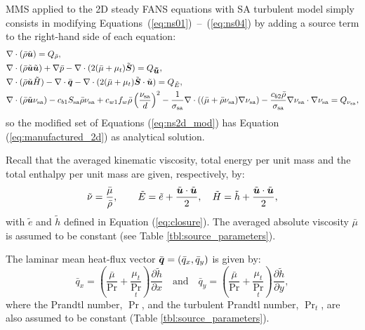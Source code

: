 \documentclass[10pt]{article}
\newcommand{\diff}[2] {\dfrac{\partial #1}{\partial #2}}
\newcommand{\bv}[1]{\ensuremath{\mbox{\boldmath$ #1 $}}}
\newcommand{\sa}{\nu_{\mathrm{sa}}}
\newcommand{\tsa}{\mathrm{sa}}
\newcommand{\brho}{\bar{\rho}}
\newcommand{\tu}{\tilde{u}}
\newcommand{\tE}{\tilde{E}}
\newcommand{\bmu}{\bar{\mu}}
\begin{document}
MMS applied to the 2D steady FANS equations with SA turbulent model simply consists in modifying Equations~(\ref{eq:ns01})~--~(\ref{eq:ns04}) by adding a source term to the right-hand side of each equation:
 \begin{equation}
 \begin{split} \label{eq:ns2d_mod}
 &\nabla \cdot \left(\bar{\rho} \tilde{\bv{u}}\right) = Q_{\brho},\\
 &\nabla\cdot\left(\bar{\rho} \tilde{\bv{u}}\tilde{\bv{u}}\right) +\nabla \bar{p} -  \nabla \cdot ( 2(\bmu+\mu_t) \tilde{\bv{S}} )= Q_{\bv{\tu}},\\
 & \nabla \cdot (\bar{\rho} \tilde{\bv{u}} \tilde{H})-\nabla \cdot \bar{\bv{q}} - \nabla\cdot(2 (\bmu+\mu_t) \tilde{\bv{S}} \cdot \tilde{\bv{u}})= Q_{\tE},\\
 &\nabla \cdot (\bar{\rho} \tilde{\bv{u}} \sa) - c_{b1} S_\tsa \bar{\rho} \sa +c_{w1} f_w \brho \left(\dfrac{\sa}{d}\right)^2 - \dfrac{1}{\sigma_{\tsa}}\nabla \cdot \left( (\bmu+\bar{\rho}  \sa) \nabla \sa\right) -\dfrac{c_{b2} \bar{\rho} }{\sigma_{\tsa}} \nabla \sa \cdot \nabla \sa =Q_{\sa},
 \end{split}
 \end{equation}
so the modified set of Equations (\ref{eq:ns2d_mod}) has Equation (\ref{eq:manufactured_2d}) as analytical solution.

Recall that the averaged kinematic viscosity, total energy per unit mass and the total enthalpy per unit mass are given, respectively, by:
\begin{equation}
 \begin{split}\label{eq:closure01}
  \tilde{\nu}=\dfrac{\bar{\mu}}{\bar{\rho}},\qquad \tilde{E}=\tilde{e}+\dfrac{\tilde{\bv{u}}\cdot \tilde{\bv{u}}}{2}, \quad \tilde{H}=\tilde{h}+\dfrac{\tilde{\bv{u}}\cdot \tilde{\bv{u}}}{2},
 \end{split}
\end{equation}
with $\tilde{e}$ and $\tilde{h}$ defined in Equation (\ref{eq:closure}). The averaged absolute viscosity $\bmu$ is assumed to be constant (see Table \ref{tbl:source_parameters}).

 The laminar mean heat-flux vector $\bar{\bv{q}}=(\bar{q}_x,\bar{q}_y)$ is given by:
%
\begin{equation}\label{eq:closure02}
 \bar{q}_x = \left(\dfrac{\bar{\mu}}{\Pr}+\dfrac{\mu_t}{\Pr_t}\right)\diff{\tilde{h}}{x}\quad \mbox{and} \quad \bar{q}_y = \left(\dfrac{\bar{\mu}}{\Pr}+\dfrac{\mu_t}{\Pr_t}\right)\diff{\tilde{h}}{y},
 \end{equation}
where the Prandtl number, $\Pr$, and the turbulent Prandtl number, $\Pr_t$, are also assumed to be constant (Table \ref{tbl:source_parameters}).
\end{document}
